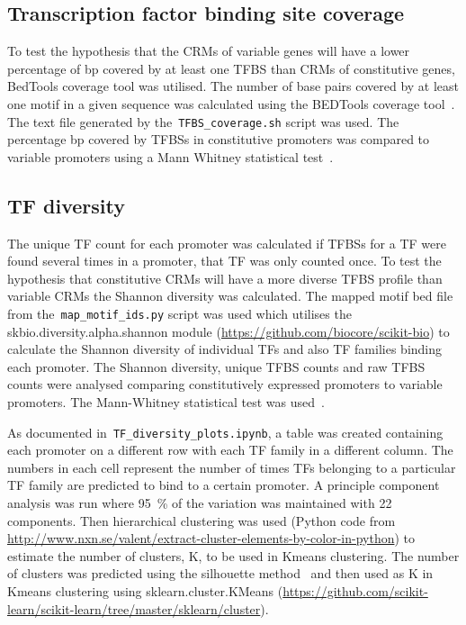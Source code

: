 \subsection{Transcription factor binding site coverage}
{\label{transcription-factor-binding-site-coverage}}
To test the hypothesis that the CRMs of variable genes will have a lower percentage of bp covered by at least one TFBS than CRMs of constitutive genes, BedTools coverage tool was utilised. The number of base pairs covered by at least one motif in a given
sequence was calculated using the BEDTools coverage
tool~\autocite{quinlanBEDToolsFlexibleSuite2010}. The text file generated by the~\texttt{TFBS\_coverage.sh} script
was used. The percentage bp covered by TFBSs in constitutive promoters
was compared to variable promoters using a Mann Whitney statistical
test~\autocite{mannTestWhetherOne1947}.

\subsection{TF diversity}
{\label{tf-diversity}}

The unique TF count for each promoter was calculated \ie{} if
TFBSs for a TF were found several times in a promoter, that TF was only counted once. To test the hypothesis that constitutive CRMs will have a more diverse TFBS profile than variable CRMs the Shannon diversity was calculated. The mapped motif bed file from the~\texttt{map\_motif\_ids.py} script
was used which utilises the skbio.diversity.alpha.shannon module
(\url{https://github.com/biocore/scikit-bio}) to calculate the
Shannon diversity of individual TFs and also TF families binding each promoter. The Shannon diversity, unique TFBS counts and raw TFBS counts were analysed comparing constitutively expressed promoters to variable promoters. The Mann\hyp{}Whitney statistical test was used~\autocite{mannTestWhetherOne1947}.

As documented in~\texttt{TF\_diversity\_plots.ipynb}, a table was created containing each promoter on a different row with each TF family in a different column. The numbers in each cell represent the number of times TFs belonging to a particular TF family are predicted to bind to a certain promoter. A principle component analysis was run where \SI{95}{\percent} of
the variation was maintained with 22 components. Then hierarchical clustering was used (Python code from \url{http://www.nxn.se/valent/extract-cluster-elements-by-color-in-python}) to estimate the number of clusters, K, to be used in Kmeans clustering. The number of clusters was predicted using the silhouette method~\autocite{rousseeuwSilhouettesGraphicalAid1987} and then used as K in Kmeans clustering using sklearn.cluster.KMeans (\url{https://github.com/scikit-learn/scikit-learn/tree/master/sklearn/cluster}).

